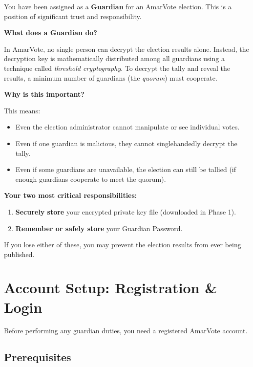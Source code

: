 \documentclass[12pt,a4paper]{book}
\begin{document}
You have been assigned as a \textbf{Guardian} for an AmarVote election. This is a position of significant trust and responsibility.

\textbf{What does a Guardian do?}

In AmarVote, no single person can decrypt the election results alone. Instead, the decryption key is mathematically distributed among all guardians using a technique called \emph{threshold cryptography}. To decrypt the tally and reveal the results, a minimum number of guardians (the \emph{quorum}) must cooperate.

\textbf{Why is this important?}

This means:
\begin{itemize}
  \item Even the election administrator cannot manipulate or see individual votes.
  \item Even if one guardian is malicious, they cannot singlehandedly decrypt the tally.
  \item Even if some guardians are unavailable, the election can still be tallied (if enough guardians cooperate to meet the quorum).
\end{itemize}

\begin{tcolorbox}[warnbox]
\textbf{Your two most critical responsibilities:}
\begin{enumerate}
  \item \textbf{Securely store} your encrypted private key file (downloaded in Phase 1).
  \item \textbf{Remember or safely store} your Guardian Password.
\end{enumerate}
If you lose either of these, you may prevent the election results from ever being published.
\end{tcolorbox}

\mainmatter

\chapter{Account Setup: Registration \& Login}
\label{ch:guard-account}

Before performing any guardian duties, you need a registered AmarVote account.

\section{Prerequisites}
\end{document}
